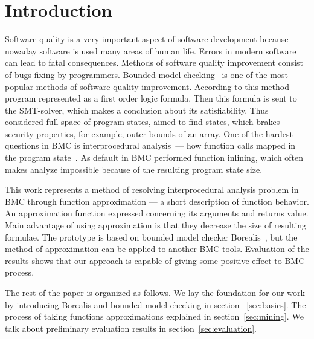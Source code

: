 \section{Introduction}
Software quality is a very important aspect of software development because nowaday software is used many areas of human life. Errors in modern software can lead to fatal consequences. Methods of software quality improvement consist of bugs fixing by programmers. Bounded model checking~\cite{biere2003bounded} is one of the most popular methods of software quality improvement. According to this method program represented as a first order logic formula. Then this formula is sent to the SMT-solver, which makes a conclusion about its satisfiability. Thus considered full space of program states, aimed to find states, which brakes security properties, for example, outer bounds of an array. One of the hardest questions in BMC is interprocedural analysis~--- how function calls mapped in the program state~\cite{InterprocIsHard}. As default in BMC performed function inlining, which often makes analyze impossible because of the resulting program state size.

This work represents a method of resolving interprocedural analysis problem in BMC through function approximation --- a short description of function behavior. An approximation function expressed concerning its arguments and returns value. Main advantage of using approximation is that they decrease the size of resulting formulae. The prototype is based on bounded model checker Borealis~\cite{Borealis}, but the method of approximation can be applied to another BMC tools. Evaluation of the results shows that our approach is capable of giving some positive effect to BMC process.

The rest of the paper is organized as follows. We lay the foundation for our work by introducing Borealis and bounded model checking in section ~\ref{sec:basics}. The process of taking functions approximations explained in section~\ref{sec:mining}. We talk about preliminary evaluation results in section~\ref{sec:evaluation}.
